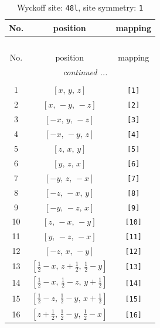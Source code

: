 \documentclass[fleqn,8pt]{jsarticle}
\begin{document}
\renewcommand{\arraystretch}{1.2}
\begin{longtable}{ccc}
\caption{Wyckoff site: {\tt 48l}, site symmetry: {\tt 1}}
 \\
 \hline \hline
No. & position & mapping \\ \hline \endfirsthead

\multicolumn{2}{l}{\tablename\ \thetable{}} \\
 \hline \hline
No. & position & mapping \\ \hline \endhead

 \hline \hline
\multicolumn{2}{r}{\footnotesize\it continued ...} \\ \endfoot

 \hline \hline
\multicolumn{2}{r}{} \\ \endlastfoot

1 & $\left[ x,\, y,\, z \right]$ & {\tt [1]} \\ \hline
2 & $\left[ x,\, - y,\, - z \right]$ & {\tt [2]} \\ \hline
3 & $\left[ - x,\, y,\, - z \right]$ & {\tt [3]} \\ \hline
4 & $\left[ - x,\, - y,\, z \right]$ & {\tt [4]} \\ \hline
5 & $\left[ z,\, x,\, y \right]$ & {\tt [5]} \\ \hline
6 & $\left[ y,\, z,\, x \right]$ & {\tt [6]} \\ \hline
7 & $\left[ - y,\, z,\, - x \right]$ & {\tt [7]} \\ \hline
8 & $\left[ - z,\, - x,\, y \right]$ & {\tt [8]} \\ \hline
9 & $\left[ - y,\, - z,\, x \right]$ & {\tt [9]} \\ \hline
10 & $\left[ z,\, - x,\, - y \right]$ & {\tt [10]} \\ \hline
11 & $\left[ y,\, - z,\, - x \right]$ & {\tt [11]} \\ \hline
12 & $\left[ - z,\, x,\, - y \right]$ & {\tt [12]} \\ \hline
13 & $\left[ \frac{1}{2} - x,\, z + \frac{1}{2},\, \frac{1}{2} - y \right]$ & {\tt [13]} \\ \hline
14 & $\left[ \frac{1}{2} - x,\, \frac{1}{2} - z,\, y + \frac{1}{2} \right]$ & {\tt [14]} \\ \hline
15 & $\left[ \frac{1}{2} - z,\, \frac{1}{2} - y,\, x + \frac{1}{2} \right]$ & {\tt [15]} \\ \hline
16 & $\left[ z + \frac{1}{2},\, \frac{1}{2} - y,\, \frac{1}{2} - x \right]$ & {\tt [16]} \\ \hline

\end{longtable}
\end{document}
